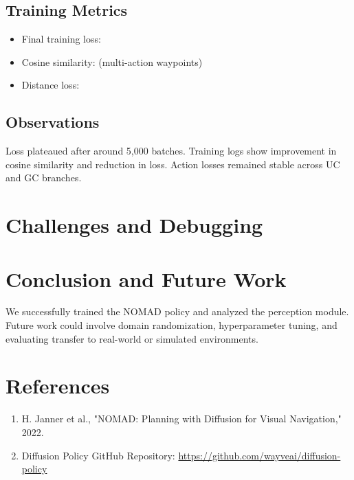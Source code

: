 \documentclass[12pt]{article}
\begin{document}
\subsection{Training Metrics}
\begin{itemize}
\item Final training loss: 
\item Cosine similarity:  (multi-action waypoints)
\item Distance loss: 
\end{itemize}

\subsection{Observations}
Loss plateaued after around 5,000 batches. Training logs show improvement in cosine similarity and reduction in loss. Action losses remained stable across UC and GC branches.

\section{Challenges and Debugging}


\section{Conclusion and Future Work}
We successfully trained the NOMAD policy and analyzed the perception module. Future work could involve domain randomization, hyperparameter tuning, and evaluating transfer to real-world or simulated environments.

\section*{References}
\begin{enumerate}
\item H. Janner et al., "NOMAD: Planning with Diffusion for Visual Navigation," 2022.
\item Diffusion Policy GitHub Repository: \url{https://github.com/wayveai/diffusion-policy}
\end{enumerate}
\end{document}
